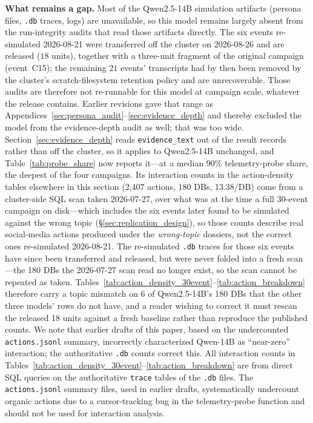 \documentclass[11pt,journal,onecolumn]{IEEEtran}
\begin{document}
\textbf{What remains a gap.} Most of the Qwen2.5-14B simulation artifacts (persona files, \texttt{.db} traces, logs) are unavailable, so this model remains largely absent from the run-integrity audits that read those artifacts directly. The six events re-simulated 2026-08-21 were transferred off the cluster on 2026-08-26 and are released ($18$ units), together with a three-unit fragment of the original campaign (event~C15); the remaining $21$ events' transcripts had by then been removed by the cluster's scratch-filesystem retention policy and are unrecoverable. Those audits are therefore not re-runnable for this model at campaign scale, whatever the release contains. Earlier revisions gave that range as Appendices~\ref{sec:persona_audit}--\ref{sec:evidence_depth} and thereby excluded the model from the evidence-depth audit as well; that was too wide. Section~\ref{sec:evidence_depth} reads \texttt{evidence\_text} out of the result records rather than off the cluster, so it applies to Qwen2.5-14B unchanged, and Table~\ref{tab:probe_share} now reports it---at a median $90\%$ telemetry-probe share, the deepest of the four campaigns. Its interaction counts in the action-density tables elsewhere in this section (2,407 actions, 180 DBs, 13.38/DB) come from a cluster-side SQL scan taken 2026-07-27, over what was at the time a full 30-event campaign on disk---which includes the six events later found to be simulated against the wrong topic (\S\ref{sec:replication_design}), so those counts describe real social-media actions produced under the \emph{wrong-topic} dossiers, not the correct ones re-simulated 2026-08-21. The re-simulated \texttt{.db} traces for those six events have since been transferred and released, but were never folded into a fresh scan---the 180 DBs the 2026-07-27 scan read no longer exist, so the scan cannot be repeated as taken. Tables~\ref{tab:action_density_30event}--\ref{tab:action_breakdown} therefore carry a topic mismatch on 6 of Qwen2.5-14B's 180 DBs that the other three models' rows do not have, and a reader wishing to correct it must rescan the released 18 units against a fresh baseline rather than reproduce the published counts. We note that earlier drafts of this paper, based on the undercounted \texttt{actions.jsonl} summary, incorrectly characterized Qwen-14B as ``near-zero'' interaction; the authoritative \texttt{.db} counts correct this. All interaction counts in Tables~\ref{tab:action_density_30event}--\ref{tab:action_breakdown} are from direct SQL queries on the authoritative \texttt{trace} tables of the \texttt{.db} files. The \texttt{actions.jsonl} summary files, used in earlier drafts, systematically undercount organic actions due to a cursor-tracking bug in the telemetry-probe function and should not be used for interaction analysis.
\end{document}
